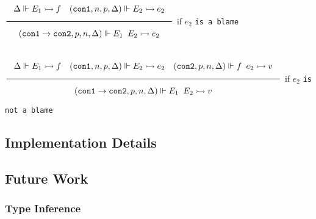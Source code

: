 \documentclass[a4paper]{article}
\newcommand{\Rule}[2]{\genfrac{}{}{0.7pt}{}{{\setlength{\fboxrule}{0pt}\setlength{\fboxsep}{3mm}\fbox{$#1$}}}{{\setlength{\fboxrule}{0pt}\setlength{\fboxsep}{3mm}\fbox{$#2$}}}}
\newcommand{\eval}{\rightarrowtail}
\newcommand{\under}{\Vdash}
\newcommand{\funCon}{\texttt{con1} \rightarrow \texttt{con2}}
\newcommand{\conA}{\texttt{con1}}
\newcommand{\conB}{\texttt{con2}}
\begin{document}
$\Rule{\Delta \under E_1 \eval f \quad (\conA, n, p, \Delta) \under E_2 \eval e_2}
{(\funCon, p, n, \Delta) \under E_1 \texttt{ } E_2 \eval e_2}$ if $e_2$ \texttt{is a blame}

$\Rule{\Delta \under E_1 \eval f \quad (\conA, n, p, \Delta) \under E_2 \eval e_2 \quad (\conB, p, n, \Delta) \under f \texttt{ } e_2 \eval v }
{(\funCon, p, n, \Delta) \under E_1 \texttt{ } E_2 \eval v}$ if $e_2$ \texttt{is not a blame}

\subsection{Implementation Details}

\subsection{Future Work}

\subsubsection{Type Inference}



\end{document}

